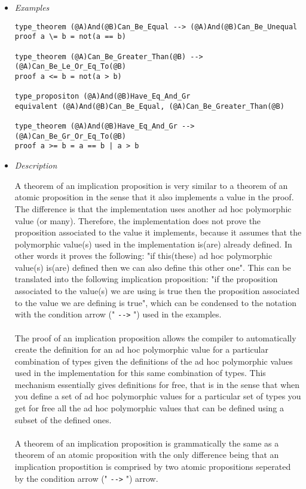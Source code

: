 \documentclass{article}
\begin{document}
\begin{itemize}
\item \textit{Examples}

\begin{verbatim}
type_theorem (@A)And(@B)Can_Be_Equal --> (@A)And(@B)Can_Be_Unequal
proof a \= b = not(a == b)

type_theorem (@A)Can_Be_Greater_Than(@B) --> (@A)Can_Be_Le_Or_Eq_To(@B)
proof a <= b = not(a > b)

type_propositon (@A)And(@B)Have_Eq_And_Gr
equivalent (@A)And(@B)Can_Be_Equal, (@A)Can_Be_Greater_Than(@B)

type_theorem (@A)And(@B)Have_Eq_And_Gr --> (@A)Can_Be_Gr_Or_Eq_To(@B)
proof a >= b = a == b | a > b
\end{verbatim}

\item \textit{Description}

A theorem of an implication proposition is very similar to a theorem of an
atomic proposition in the sense that it also implements a value in the proof.
The difference is that the implementation uses another ad hoc polymorphic value
(or many). Therefore, the implementation does not prove the proposition
associated to the value it implements, because it assumes that the polymorphic
value(s) used in the implementation is(are) already defined. In other words it
proves the following: "if this(these) ad hoc polymorphic value(s) is(are)
defined then we can also define this other one". This can be translated into
the following implication proposition: "if the proposition associated to the
value(s) we are using is true then the proposition associated to the value we
are defining is true", which can be condensed to the notation with the
condition arrow (" \verb|-->| ") used in the examples.
\\\\
The proof of an implication proposition allows the compiler to
automatically create the definition for an ad hoc polymorphic value for a
particular combination of types given the definitions of the ad hoc polymorphic
values used in the implementation for this same combination of types. This
mechanism essentially gives definitions for free, that is in the sense that
when you define a set of ad hoc polymorphic values for a particular set of
types you get for free all the ad hoc polymorphic values that can be defined
using a subset of the defined ones.
\\\\
A theorem of an implication proposition is grammatically the same as
a theorem of an atomic proposition with the only difference being that an
implication propostition is comprised by two atomic propositions seperated by
the condition arrow (" \verb|-->| ") arrow.

\end{itemize}
\end{document}
